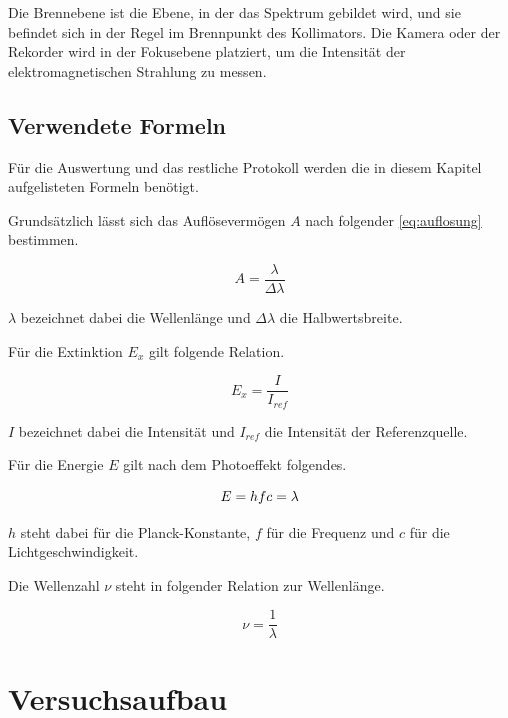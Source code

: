 \documentclass[12pt,english,ngerman]{scrartcl}
\begin{document}
Die Brennebene ist die Ebene, in der das Spektrum gebildet wird, und sie
befindet sich in der Regel im Brennpunkt des Kollimators. Die Kamera oder der
Rekorder wird in der Fokusebene platziert, um die Intensität der
elektromagnetischen Strahlung zu messen.

\subsection{Verwendete Formeln}

Für die Auswertung und das restliche Protokoll werden die in diesem Kapitel aufgelisteten Formeln benötigt.


Grundsätzlich lässt sich das Auflösevermögen $A$ nach folgender \autoref{eq:auflosung} bestimmen.

\begin{equation}
	A = \frac{\lambda}{\Delta\lambda}
	\label{eq:auflosung}
\end{equation}

$\lambda$ bezeichnet dabei die Wellenlänge und $\Delta\lambda$ die Halbwertsbreite.

Für die Extinktion $E_x$ gilt folgende Relation.

\begin{equation}
	E_x = \frac{I}{I_{ref}}
	\label{eq:extinktion}
\end{equation}

$I$ bezeichnet dabei die Intensität und $I_{ref}$ die Intensität der Referenzquelle.

Für die Energie $E$ gilt nach dem Photoeffekt folgendes.

\begin{equation}
	E = h f \\
	c = \lambda 
	\label{eq:energie}
\end{equation}

$h$ steht dabei für die Planck-Konstante, $f$ für die Frequenz und $c$ für die Lichtgeschwindigkeit.

Die Wellenzahl $\nu$ steht in folgender Relation zur Wellenlänge.

\begin{equation}
	\nu = \frac{1}{\lambda}
	\label{eq:wellenzahl}
\end{equation}



\section{Versuchsaufbau}\label{sec:aufbau}
\end{document}
